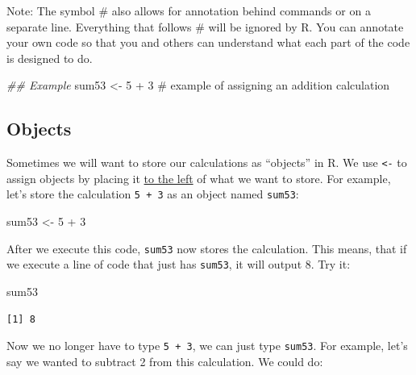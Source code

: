 \documentclass[
  letterpaper,
  DIV=11,
  numbers=noendperiod]{scrreprt}
\newenvironment{Shaded}{\begin{snugshade}}{\end{snugshade}}
\newcommand{\CommentTok}[1]{\textcolor[rgb]{0.37,0.37,0.37}{#1}}
\newcommand{\DecValTok}[1]{\textcolor[rgb]{0.68,0.00,0.00}{#1}}
\newcommand{\DocumentationTok}[1]{\textcolor[rgb]{0.37,0.37,0.37}{\textit{#1}}}
\newcommand{\NormalTok}[1]{\textcolor[rgb]{0.00,0.23,0.31}{#1}}
\newcommand{\OtherTok}[1]{\textcolor[rgb]{0.00,0.23,0.31}{#1}}
\newcommand{\SpecialCharTok}[1]{\textcolor[rgb]{0.37,0.37,0.37}{#1}}
\begin{document}
Note: The symbol \# also allows for annotation behind commands or on a
separate line. Everything that follows \# will be ignored by R. You can
annotate your own code so that you and others can understand what each
part of the code is designed to do.

\begin{Shaded}
\begin{Highlighting}[]
\DocumentationTok{\#\# Example}
\NormalTok{sum53 }\OtherTok{\textless{}{-}} \DecValTok{5} \SpecialCharTok{+} \DecValTok{3} \CommentTok{\# example of assigning an addition calculation}
\end{Highlighting}
\end{Shaded}

\hypertarget{objects}{%
\subsection{Objects}\label{objects}}

Sometimes we will want to store our calculations as ``objects'' in R. We
use \texttt{\textless{}-} to assign objects by placing it
\href{https://www.youtube.com/watch?v=vLZA67L7gIo\&ab_channel=BeyonceSasha1}{to
the left} of what we want to store. For example, let's store the
calculation \texttt{5\ +\ 3} as an object named \texttt{sum53}:

\begin{Shaded}
\begin{Highlighting}[]
\NormalTok{sum53 }\OtherTok{\textless{}{-}} \DecValTok{5} \SpecialCharTok{+} \DecValTok{3}
\end{Highlighting}
\end{Shaded}

After we execute this code, \texttt{sum53} now stores the calculation.
This means, that if we execute a line of code that just has
\texttt{sum53}, it will output 8. Try it:

\begin{Shaded}
\begin{Highlighting}[]
\NormalTok{sum53}
\end{Highlighting}
\end{Shaded}

\begin{verbatim}
[1] 8
\end{verbatim}

Now we no longer have to type \texttt{5\ +\ 3}, we can just type
\texttt{sum53}. For example, let's say we wanted to subtract 2 from this
calculation. We could do:
\end{document}
